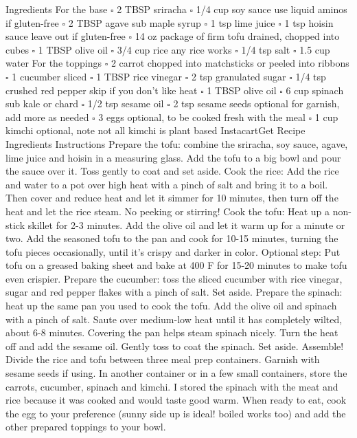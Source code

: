 Ingredients For the base {\tiny$\square$} 2 TBSP sriracha {\tiny$\square$} 1/4 cup soy sauce use liquid aminos if gluten-free {\tiny$\square$} 2 TBSP agave sub maple syrup {\tiny$\square$} 1 tsp lime juice {\tiny$\square$} 1 tsp hoisin sauce leave out if gluten-free {\tiny$\square$} 14 oz package of firm tofu drained, chopped into cubes {\tiny$\square$} 1 TBSP olive oil {\tiny$\square$} 3/4 cup rice any rice works {\tiny$\square$} 1/4 tsp salt {\tiny$\square$} 1.5 cup water For the toppings {\tiny$\square$} 2 carrot chopped into matchsticks or peeled into ribbons {\tiny$\square$} 1 cucumber sliced {\tiny$\square$} 1 TBSP rice vinegar {\tiny$\square$} 2 tsp granulated sugar {\tiny$\square$} 1/4 tsp crushed red pepper skip if you don’t like heat {\tiny$\square$} 1 TBSP olive oil {\tiny$\square$} 6 cup spinach sub kale or chard {\tiny$\square$} 1/2 tsp sesame oil {\tiny$\square$} 2 tsp sesame seeds optional for garnish, add more as needed {\tiny$\square$} 3 eggs optional, to be cooked fresh with the meal {\tiny$\square$} 1 cup kimchi optional, note not all kimchi is plant based InstacartGet Recipe Ingredients Instructions Prepare the tofu: combine the sriracha, soy sauce, agave, lime juice and hoisin in a measuring glass. Add the tofu to a big bowl and pour the sauce over it. Toss gently to coat and set aside. Cook the rice: Add the rice and water to a pot over high heat with a pinch of salt and bring it to a boil. Then cover and reduce heat and let it simmer for 10 minutes, then turn off the heat and let the rice steam. No peeking or stirring! Cook the tofu: Heat up a non-stick skillet for 2-3 minutes. Add the olive oil and let it warm up for a minute or two. Add the seasoned tofu to the pan and cook for 10-15 minutes, turning the tofu pieces occasionally, until it’s crispy and darker in color. Optional step: Put tofu on a greased baking sheet and bake at 400 F for 15-20 minutes to make tofu even crispier. Prepare the cucumber: toss the sliced cucumber with rice vinegar, sugar and red pepper flakes with a pinch of salt. Set aside. Prepare the spinach: heat up the same pan you used to cook the tofu. Add the olive oil and spinach with a pinch of salt. Saute over medium-low heat until it has completely wilted, about 6-8 minutes. Covering the pan helps steam spinach nicely. Turn the heat off and add the sesame oil. Gently toss to coat the spinach. Set aside. Assemble! Divide the rice and tofu between three meal prep containers. Garnish with sesame seeds if using. In another container or in a few small containers, store the carrots, cucumber, spinach and kimchi. I stored the spinach with the meat and rice because it was cooked and would taste good warm. When ready to eat, cook the egg to your preference (sunny side up is ideal! boiled works too) and add the other prepared toppings to your bowl.
\par

